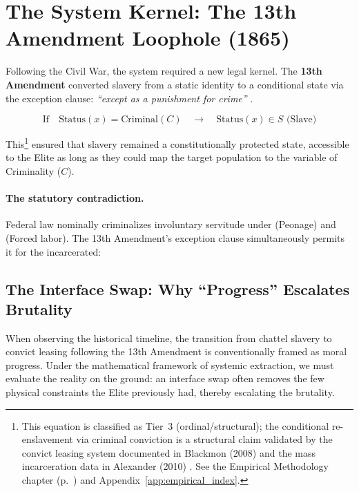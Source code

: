 \section{The System Kernel: The 13th Amendment Loophole (1865)}
Following the Civil War, the system required a new legal kernel. The \textbf{13th Amendment} converted slavery from a static identity to a conditional state via the exception clause: \textit{``except as a punishment for crime''} \cite{alexander, blackmon, thirteenth}.

\begin{equation}\label{eq:6.3-thirteenth-amendment-exception}
\text{If} \quad \text{Status}(x) = \text{Criminal}(C) \quad \rightarrow \quad \text{Status}(x) \in S \text{ (Slave)}
\end{equation}

This\footnote{This equation is classified as Tier~3 (ordinal/structural); the conditional re-enslavement via criminal conviction is a structural claim validated by the convict leasing system documented in Blackmon (2008) \cite{blackmon} and the mass incarceration data in Alexander (2010) \cite{alexander}. See the Empirical Methodology chapter (p.~\pageref{ch:empirical_methodology}) and Appendix~\ref{app:empirical_index}.} ensured that slavery remained a constitutionally protected state, accessible to the Elite as long as they could map the target population to the variable of Criminality ($C$).

\paragraph{The statutory contradiction.}
Federal law nominally criminalizes involuntary servitude under  (Peonage) and  (Forced labor). The 13th Amendment's exception clause simultaneously permits it for the incarcerated:

\subsection{The Interface Swap: Why ``Progress'' Escalates Brutality}

When observing the historical timeline, the transition from chattel slavery to convict leasing following the 13th Amendment is conventionally framed as moral progress. Under the mathematical framework of systemic extraction, we must evaluate the reality on the ground: an interface swap often removes the few physical constraints the Elite previously had, thereby escalating the brutality.

